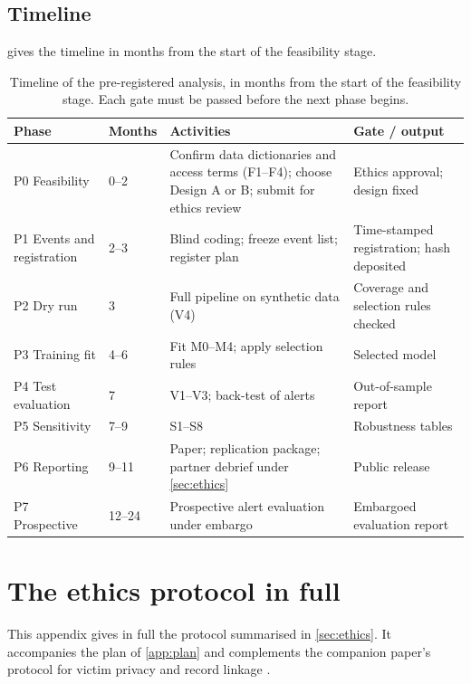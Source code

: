 \subsection{Timeline}\label{sec:plan-timeline}

 gives the timeline in months from the start of the
feasibility stage.

\begin{table}[!htbp]
\centering
\caption{Timeline of the pre-registered analysis, in months from the start
of the feasibility stage. Each gate must be passed before the next phase
begins.}
\label{tab:plan-timeline}
\footnotesize
\renewcommand{\arraystretch}{1.15}
\begin{tabularx}{\textwidth}{@{}l l >{\raggedright\arraybackslash}X >{\raggedright\arraybackslash}p{4.2cm}@{}}
\toprule
Phase & Months & Activities & Gate / output \\
\midrule
P0 Feasibility & 0--2 & Confirm data dictionaries and access terms (F1--F4); choose Design A or B; submit for ethics review & Ethics approval; design fixed \\
P1 Events and registration & 2--3 & Blind coding; freeze event list; register plan & Time-stamped registration; hash deposited \\
P2 Dry run & 3 & Full pipeline on synthetic data (V4) & Coverage and selection rules checked \\
P3 Training fit & 4--6 & Fit M0--M4; apply selection rules & Selected model \\
P4 Test evaluation & 7 & V1--V3; back-test of alerts & Out-of-sample report \\
P5 Sensitivity & 7--9 & S1--S8 & Robustness tables \\
P6 Reporting & 9--11 & Paper; replication package; partner debrief under \cref{sec:ethics} & Public release \\
P7 Prospective & 12--24 & Prospective alert evaluation under embargo & Embargoed evaluation report \\
\bottomrule
\end{tabularx}
\end{table}

\FloatBarrier
\section{The ethics protocol in full}\label{app:ethics}

This appendix gives in full the protocol summarised in \cref{sec:ethics}. It accompanies
the plan of \cref{app:plan} and complements the companion paper's protocol for victim
privacy and record linkage \citep{kornsteinlab2026darkfigure}.

